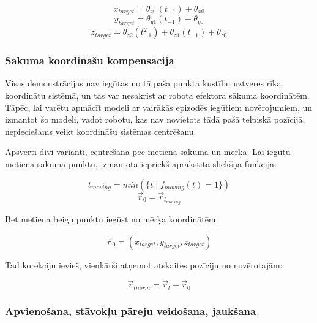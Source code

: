 \documentclass[12pt, a4paper]{article}
\numberwithin{equation}{section} %
\begin{document}
\begin{equation}
    x_{target} = \theta_{x1}(t_{-1}) + \theta_{x0}
\end{equation}
\begin{equation}
    y_{target} = \theta_{y1}(t_{-1}) + \theta_{y0}
\end{equation}
\begin{equation}
    z_{target} = \theta_{z2}(t_{-1}^2) + \theta_{z1}(t_{-1}) + \theta_{z0}
\end{equation}

\subsubsection{Sākuma koordināšu kompensācija}

Visas demonstrācijas nav iegūtas no tā paša punkta kustību uztveres rīka koordinātu sistēmā, un tas var nesakrist ar robota efektora sākuma koordinātēm. Tāpēc, lai varētu apmācīt modeli ar vairākās epizodēs iegūtiem novērojumiem, un izmantot šo modeli, vadot robotu, kas nav novietots tādā pašā telpiskā pozīcijā, nepieciešams veikt koordināšu sistēmas centrēšanu.

Apsvērti divi varianti, centrēšana pēc metiena sākuma un mērķa. Lai iegūtu metiena sākuma punktu, izmantota iepriekš aprakstītā sliekšņa funkcija:

\begin{equation}
    t_{moving} = min(\lbrace t \mid f_{moving}(t) = 1 \rbrace)
\end{equation}
\begin{equation}
    \vec{r}_{0} = \vec{r}_{t_{moving}}
\end{equation}

Bet metiena beigu punktu iegūst no mērķa koordinātēm:

\begin{equation}
    \vec{r}_{0} = ( x_{target}, y_{target}, z_{target} )
\end{equation}

Tad korekciju ievieš, vienkārši atņemot atskaites pozīciju no novērotajām:

\begin{equation}
    \vec{r}_{tnorm} = \vec{r}_t - \vec{r}_0
\end{equation}

\subsubsection{Apvienošana, stāvokļu pāreju veidošana, jaukšana}
\end{document}
